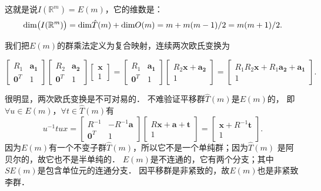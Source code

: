 这就是说$I(\mathbb{R}^m)=E(m)$，它的维数是：
\begin{equation*}
    {\rm dim}\bigl(I(\mathbb{R}^m)\bigr)= {\rm dim}  \hat{T}(m) + {\rm dim} O(m)
    = m + m(m-1)/2 = m(m+1)/2 .
\end{equation*}



我们把$E(m)$的群乘法定义为复合映射，连续两次欧氏变换为
\begin{small}
\setlength{\mathindent}{0em}
\begin{equation}\label{chlg:eqn_Emtimes}
    \begin{bmatrix}  R_1 & \boldsymbol{a_1} \\ \boldsymbol{0}^T & 1  \end{bmatrix}
    \begin{bmatrix}  R_2 & \boldsymbol{a_2} \\ \boldsymbol{0}^T & 1  \end{bmatrix}
    \begin{bmatrix}  \boldsymbol{x} \\ 1 \end{bmatrix} 
    =\begin{bmatrix}  R_1 & \boldsymbol{a_1} \\ \boldsymbol{0}^T & 1  \end{bmatrix}
    \begin{bmatrix}  R_2\boldsymbol{x} + \boldsymbol{a_2} \\  1  \end{bmatrix}
    =\begin{bmatrix}  R_1 R_2\boldsymbol{x} + R_1 \boldsymbol{a_2} +\boldsymbol{a_1} \\  1  \end{bmatrix}.
\end{equation}\setlength{\mathindent}{2em}
\end{small}
很明显，两次欧氏变换是不可对易的．
不难验证平移群$\hat{T}(m)$是$E(m)$的，
即$\forall u \in E(m)$，$\forall t \in \hat{T}(m)$有
\begin{equation}
    u^{-1} t u x= 
    \begin{bmatrix}  R^{-1} & -R^{-1} \boldsymbol{a} \\ \boldsymbol{0}^T & 1    \end{bmatrix}
    \begin{bmatrix}  R\boldsymbol{x} + \boldsymbol{a} +  \boldsymbol{t}\\  1  \end{bmatrix}
    =\begin{bmatrix} \boldsymbol{x} + R^{-1} \boldsymbol{t}\\  1  \end{bmatrix}.
\end{equation}
因为$E(m)$有一个不变子群$\hat{T}(m)$，所以它不是一个单纯群；因为$\hat{T}(m)$
是阿贝尔的，故它也不是半单纯的．
$E(m)$是不连通的，它有两个分支；其中$SE(m)$是包含单位元的连通分支．
因平移群是非紧致的，故$E(m)$也是非紧致李群．

